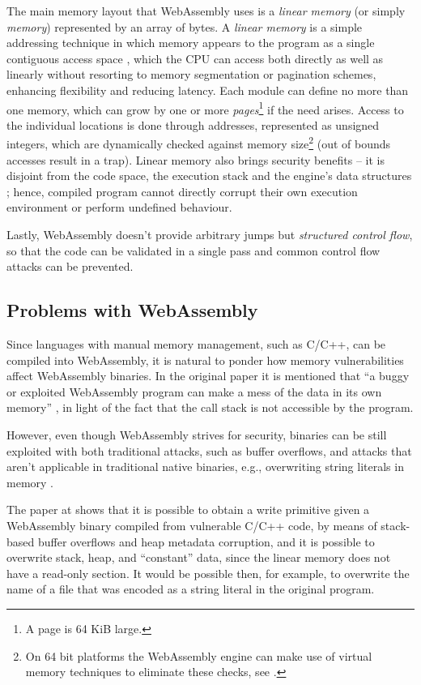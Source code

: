 The main memory layout that WebAssembly uses is a \textit{linear memory} (or simply \textit{memory}) represented
by an array of bytes. A \textit{linear memory} is a simple addressing technique in which memory appears to the
program as a single contiguous access space \cite{processor-microarchitecture}, which the CPU can access both directly as well as linearly
without resorting to memory segmentation or pagination schemes, enhancing flexibility and reducing latency.
Each module can define no more than one memory, which can grow by one or more
\textit{pages}\footnote{A page is 64 KiB large.} if the need arises.
Access to the individual locations is done through addresses, represented as unsigned integers,
which are dynamically checked against memory size\footnote{On 64 bit platforms the WebAssembly engine
can make use of virtual memory techniques to eliminate these checks, see \cite{bringing-the-web-up-to-speed-2017}.}
(out of bounds accesses result in a trap).
Linear memory also brings security benefits -- it is disjoint from the code space, the execution stack and the engine's
data structures \cite{bringing-the-web-up-to-speed-2017}; hence, compiled program cannot directly corrupt their own execution
environment or perform undefined behaviour.

Lastly, WebAssembly doesn't provide arbitrary jumps but \textit{structured control flow},
so that the code can be validated in a single pass and common control flow attacks can be prevented.

\subsection{Problems with WebAssembly}

Since languages with manual memory management, such as C/C++, can be compiled into WebAssembly,
it is natural to ponder how memory vulnerabilities affect WebAssembly binaries.
In the original paper it is mentioned that ``a buggy or exploited WebAssembly program can make a mess of the data in its own memory''
\cite{bringing-the-web-up-to-speed-2017}, in light of the fact that the call stack is not accessible by the program.

However, even though WebAssembly strives for security, binaries can be still exploited with both traditional attacks,
such as buffer overflows, and attacks that aren't applicable in traditional native binaries, e.g., overwriting
string literals in memory \cite{binary-security-wasm-2020}.

The paper at \cite{binary-security-wasm-2020} shows that it is possible to obtain a write primitive given a WebAssembly binary compiled from vulnerable C/C++ code,
by means of stack-based buffer overflows and heap metadata corruption, and it is possible to overwrite stack, heap, and ``constant''
data, since the linear memory does not have a read-only section. It would be possible then, for example, to overwrite the name
of a file that was encoded as a string literal in the original program.

